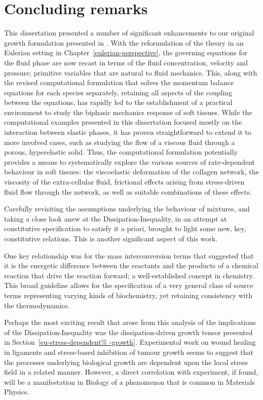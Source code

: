 \chapter{Concluding remarks}
\label{conclusions}

This dissertation presented a number of significant enhancements to
our original growth formulation presented in \citet{growthpaper}.
With the reformulation of the theory in an Eulerian setting in
Chapter~\ref{eulerian-perspective}, the governing equations for the
fluid phase are now recast in terms of the fluid concentration,
velocity and pressure; primitive variables that are natural to fluid
mechanics. This, along with the revised computational formulation that
solves the momentum balance equations for each species separately,
retaining all aspects of the coupling between the equations, has
rapidly led to the establishment of a practical environment to study
the biphasic mechanics response of soft tissues. While the
computational examples presented in this dissertation focused mostly
on the interaction between elastic phases, it has proven
straightforward to extend it to more involved cases, such as studying
the flow of a viscous fluid through a porous, hyperelastic
solid. Thus, the computational formulation potentially provides a
means to systematically explore the various sources of rate-dependent
behaviour in soft tissues: the viscoelastic deformation of the
collagen network, the viscosity of the extra-cellular fluid,
frictional effects arising from stress-driven fluid flow through the
network, as well as suitable combinations of these effects.

Carefully revisiting the assumptions underlying the behaviour of
mixtures, and taking a close look anew at the Dissipation-Inequality,
in an attempt at constitutive specification to satisfy it a priori,
brought to light some new, key, constitutive relations. This is
another significant aspect of this work.

One key relationship was for the mass interconversion terms that
suggested that it is the energetic difference between the reactants
and the products of a chemical reaction that drive the reaction forward; a
well-established concept in chemistry. This broad guideline allows for
the specification of a very general class of source terms representing
varying kinds of biochemistry, yet retaining consistency with the
thermodynamics.

Perhaps the most exciting result that arose from this analysis of the
implications of the Dissipation-Inequality was the dissipation-driven
growth tensor presented in Section~\ref{eu-stress-dependent%
  -growth}. Experimental work on wound healing in ligaments
\citep{Provenzanoetal:2003} and stress-based inhibition of tumour
growth \citep{jain1997} seems to suggest that the processes underlying
biological growth are dependent upon the local stress field in a
related manner. However, a direct correlation with experiment, if
found, will be a manifestation in Biology of a phenomenon that is
common in Materials Physics.

%

